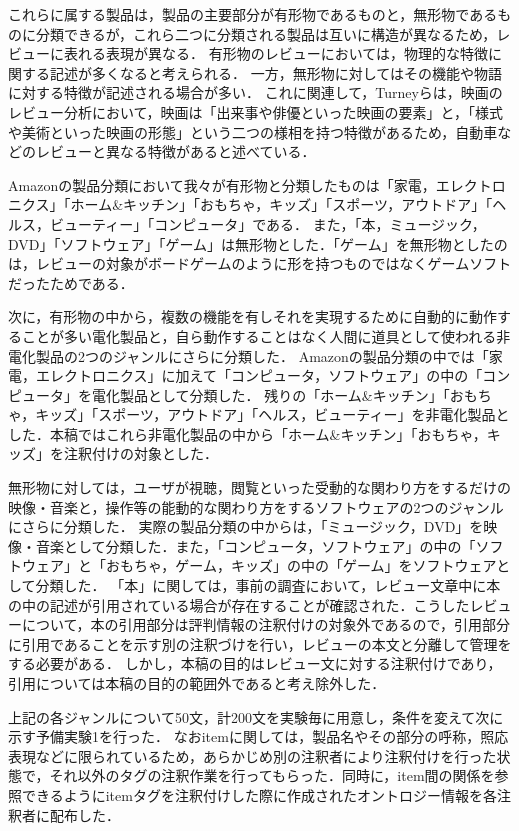 \documentclass[japanese]{jnlp_1.4}
\begin{document}
これらに属する製品は，製品の主要部分が有形物であるものと，無形物であるものに分類できるが，これら二つに分類される製品は互いに構造が異なるため，レビューに表れる表現が異なる．
有形物のレビューにおいては，物理的な特徴に関する記述が多くなると考えられる．
一方，無形物に対してはその機能や物語に対する特徴が記述される場合が多い．
これに関連して，Turneyらは，映画のレビュー分析において，映画は「出来事や俳優といった映画の要素」と，「様式や美術といった映画の形態」という二つの様相を持つ特徴があるため，自動車などのレビューと異なる特徴があると述べている．

Amazonの製品分類において我々が有形物と分類したものは「家電，エレクトロニクス」「ホーム\&キッチン」「おもちゃ，キッズ」「スポーツ，アウトドア」「ヘルス，ビューティー」「コンピュータ」である．
また，「本，ミュージック，DVD」「ソフトウェア」「ゲーム」は無形物とした．「ゲーム」を無形物としたのは，レビューの対象がボードゲームのように形を持つものではなくゲームソフトだったためである．

次に，有形物の中から，複数の機能を有しそれを実現するために自動的に動作することが多い電化製品と，自ら動作することはなく人間に道具として使われる非電化製品の2つのジャンルにさらに分類した．
Amazonの製品分類の中では「家電，エレクトロニクス」に加えて「コンピュータ，ソフトウェア」の中の「コンピュータ」を電化製品として分類した．
残りの「ホーム\&キッチン」「おもちゃ，キッズ」「スポーツ，アウトドア」「ヘルス，ビューティー」を非電化製品とした．本稿ではこれら非電化製品の中から「ホーム\&キッチン」「おもちゃ，キッズ」を注釈付けの対象とした．

無形物に対しては，ユーザが視聴，閲覧といった受動的な関わり方をするだけの映像・音楽と，操作等の能動的な関わり方をするソフトウェアの2つのジャンルにさらに分類した．
実際の製品分類の中からは，「ミュージック，DVD」を映像・音楽として分類した．また，「コンピュータ，ソフトウェア」の中の「ソフトウェア」と「おもちゃ，ゲーム，キッズ」の中の「ゲーム」をソフトウェアとして分類した．
「本」に関しては，事前の調査において，レビュー文章中に本の中の記述が引用されている場合が存在することが確認された．こうしたレビューについて，本の引用部分は評判情報の注釈付けの対象外であるので，引用部分に引用であることを示す別の注釈づけを行い，レビューの本文と分離して管理をする必要がある．
しかし，本稿の目的はレビュー文に対する注釈付けであり，引用については本稿の目的の範囲外であると考え除外した．

上記の各ジャンルについて50文，計200文を実験毎に用意し，条件を変えて次に示す予備実験1を行った．
なおitemに関しては，製品名やその部分の呼称，照応表現などに限られているため，あらかじめ別の注釈者により注釈付けを行った状態で，それ以外のタグの注釈作業を行ってもらった．同時に，item間の関係を参照できるようにitemタグを注釈付けした際に作成されたオントロジー情報を各注釈者に配布した．
\end{document}
